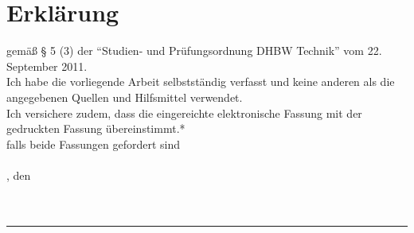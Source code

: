 \section{Erklärung}

gemäß § 5 (3) der \enquote{Studien- und Prüfungsordnung DHBW Technik} vom 22. September 2011.\\
Ich habe die vorliegende Arbeit selbstständig verfasst und keine anderen als die angegebenen Quellen und Hilfsmittel verwendet.\\
Ich versichere zudem, dass die eingereichte elektronische Fassung mit der gedruckten Fassung übereinstimmt.*\\
{\footnotesize * falls beide Fassungen gefordert sind}\\\\
\ort, den \datum\\\\\\
\rule{\columnwidth}{1pt}
